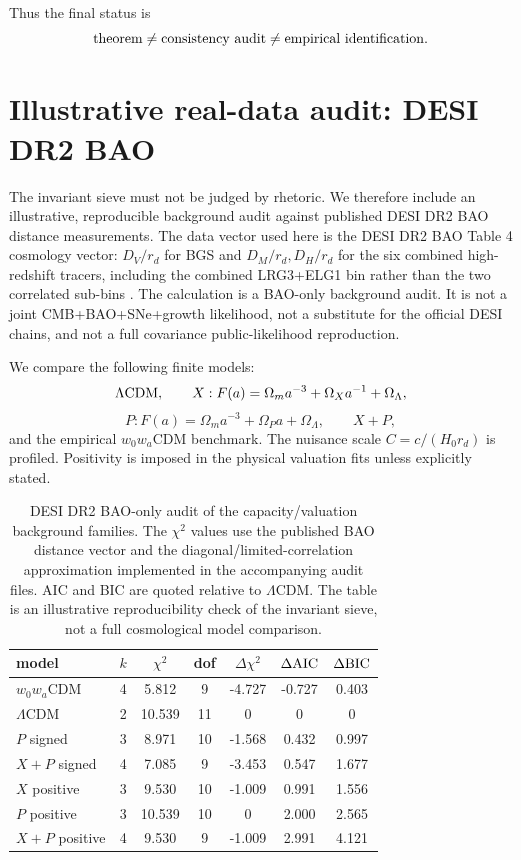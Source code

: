 \documentclass[aps,prd,reprint,nofootinbib,superscriptaddress]{revtex4-2}
\numberwithin{equation}{section}
\theoremstyle{definition}
\theoremstyle{plain}
\begin{document}
Thus the final status is
\[
{\rm theorem}\ne{\rm consistency\ audit}\ne{\rm empirical\ identification}.
\]


\section{Illustrative real-data audit: DESI DR2 BAO}\label{sec:real-data-audit}

The invariant sieve must not be judged by rhetoric.  We therefore include an illustrative, reproducible background audit against published DESI DR2 BAO distance measurements.  The data vector used here is the DESI DR2 BAO Table 4 cosmology vector: \(D_V/r_d\) for BGS and \(D_M/r_d,D_H/r_d\) for the six combined high-redshift tracers, including the combined LRG3+ELG1 bin rather than the two correlated sub-bins \cite{DESIDR2BAO2025}.  The calculation is a BAO-only background audit.  It is not a joint CMB+BAO+SNe+growth likelihood, not a substitute for the official DESI chains, and not a full covariance public-likelihood reproduction.

We compare the following finite models:
\[
\Lambda{\rm CDM},\qquad
X:{F(a)=\Omega_m a^{-3}+\Omega_Xa^{-1}+\Omega_\Lambda},
\]
\[
P:{F(a)=\Omega_m a^{-3}+\Omega_Pa+\Omega_\Lambda},
\qquad
X+P,
\]
and the empirical \(w_0w_a\)CDM benchmark.  The nuisance scale \(C=c/(H_0r_d)\) is profiled.  Positivity is imposed in the physical valuation fits unless explicitly stated.

\begin{table}[t]
\caption{DESI DR2 BAO-only audit of the capacity/valuation background families.  The \(\chi^2\) values use the published BAO distance vector and the diagonal/limited-correlation approximation implemented in the accompanying audit files.  AIC and BIC are quoted relative to \(\Lambda\)CDM.  The table is an illustrative reproducibility check of the invariant sieve, not a full cosmological model comparison.}
\label{tab:bao-audit}
\begin{ruledtabular}
\begin{tabular}{lcccccc}
model & \(k\) & \(\chi^2\) & dof & \(\Delta\chi^2\) & \(\Delta{\rm AIC}\) & \(\Delta{\rm BIC}\)\\
\hline
\(w_0w_a\)CDM & 4 & 5.812 & 9 & -4.727 & -0.727 & 0.403\\
\(\Lambda\)CDM & 2 & 10.539 & 11 & 0 & 0 & 0\\
\(P\) signed & 3 & 8.971 & 10 & -1.568 & 0.432 & 0.997\\
\(X+P\) signed & 4 & 7.085 & 9 & -3.453 & 0.547 & 1.677\\
\(X\) positive & 3 & 9.530 & 10 & -1.009 & 0.991 & 1.556\\
\(P\) positive & 3 & 10.539 & 10 & 0 & 2.000 & 2.565\\
\(X+P\) positive & 4 & 9.530 & 9 & -1.009 & 2.991 & 4.121
\end{tabular}
\end{ruledtabular}
\end{table}
\end{document}
